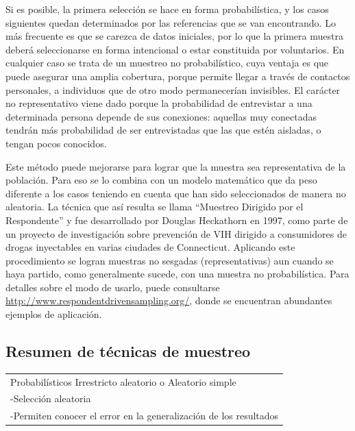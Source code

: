 \documentclass[]{article}
\begin{document}
Si es posible, la primera selección se hace en forma probabilística, y
los casos siguientes quedan determinados por las referencias que se van
encontrando. Lo más frecuente es que se carezca de datos iniciales, por
lo que la primera muestra deberá seleccionarse en forma intencional o
estar constituida por voluntarios. En cualquier caso se trata de un
muestreo no probabilístico, cuya ventaja es que puede asegurar una
amplia cobertura, porque permite llegar a través de contactos
personales, a individuos que de otro modo permanecerían invisibles. El
carácter no representativo viene dado porque la probabilidad de
entrevistar a una determinada persona depende de sus conexiones:
aquellas muy conectadas tendrán más probabilidad de ser entrevistadas
que las que estén aisladas, o tengan pocos conocidos.

Este método puede mejorarse para lograr que la muestra sea
representativa de la población. Para eso se lo combina con un modelo
matemático que da peso diferente a los casos teniendo en cuenta que han
sido seleccionados de manera no aleatoria. La técnica que así resulta se
llama ``Muestreo Dirigido por el Respondente'' y fue desarrollado por
Douglas Heckathorn en 1997, como parte de un proyecto de investigación
sobre prevención de VIH dirigido a consumidores de drogas inyectables en
varias ciudades de Connecticut. Aplicando este procedimiento se logran
muestras no sesgadas (representativas) aun cuando se haya partido, como
generalmente sucede, con una muestra no probabilística. Para detalles
sobre el modo de usarlo, puede consultarse
\url{http://www.respondentdrivensampling.org/}, donde se encuentran abundantes
ejemplos de aplicación.

\hypertarget{resumen-de-tecnicas-de-muestreo}{%
\subsection{Resumen de técnicas de muestreo}\label{resumen-de-tecnicas-de-muestreo}}

\begin{longtable}[]{@{}l@{}}
\toprule
\endhead
\begin{minipage}[t]{0.96\columnwidth}\raggedright
Probabilísticos Irrestricto aleatorio o Aleatorio simple\strut
\end{minipage}\tabularnewline
\begin{minipage}[t]{0.96\columnwidth}\raggedright
-Selección aleatoria\strut
\end{minipage}\tabularnewline
\begin{minipage}[t]{0.96\columnwidth}\raggedright
-Permiten conocer el error en la generalización de los resultados\strut
\end{minipage}\tabularnewline
\bottomrule
\end{longtable}
\end{document}
